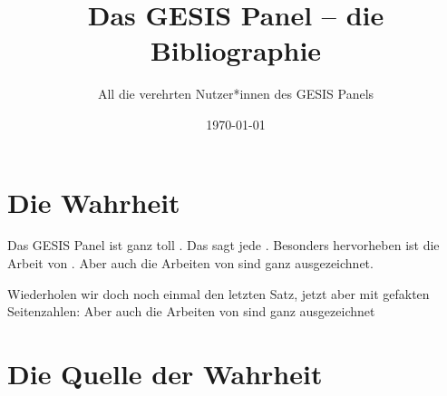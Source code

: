 \documentclass[fontsize=12pt, paper=a4]{scrartcl}
\title{Das GESIS Panel -- die Bibliographie}
\author{All die verehrten Nutzer*innen des GESIS Panels}
\date{\today}
\begin{document}
\maketitle

\section{Die Wahrheit}

Das GESIS Panel ist ganz toll \parencite{bosnjak_establishing_2017}. Das sagt 
jede \parencite{struminskaya_respondent_2016}. Besonders hervorheben ist die 
Arbeit von \textcite[616]{wahlig_panelmanagement:_2018}. Aber auch die Arbeiten 
von \textcites{ackermann_stealth_2018, 
bosnjak_establishing_2017,blom_comparison_2016,danner_development_2016} sind 
ganz ausgezeichnet.

Wiederholen wir doch noch einmal den letzten Satz, jetzt aber mit gefakten 
Seitenzahlen: Aber auch die Arbeiten von 
\textcites[123]{ackermann_stealth_2018}[34]{bosnjak_establishing_2017}
{blom_comparison_2016}[vgl. besonders][897]{danner_development_2016} sind ganz 
ausgezeichnet


\section{Die Quelle der Wahrheit}

\begin{footnotesize}
TeX}]{biblatex-sample.tex}	
\end{footnotesize}


\printbibliography
\end{document}
